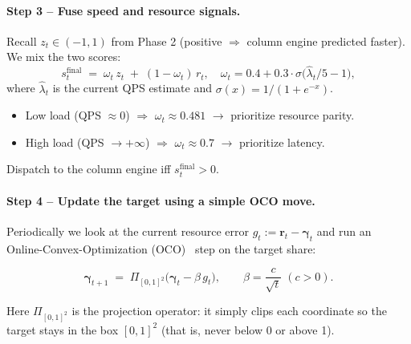 \documentclass[sigconf, nonacm]{acmart}
\begin{document}
\paragraph{Step 3 – Fuse speed and resource signals.}
Recall $z_t\in(-1,1)$ from Phase 2
(positive $\Rightarrow$ column engine predicted faster).
We mix the two scores:
\[
  s^{\text{final}}_t
  \;=\;
  \omega_t\,z_t \;+\; (1-\omega_t)\,r_t,
\quad
  \omega_t = 
    0.4 + 0.3 \cdot
    \sigma\!\bigl(\hat\lambda_t/5-1\bigr),
\]
where \(\hat{\lambda}_t\) is the current QPS estimate and \(\sigma(x) = 1/(1 + e^{-x})\).  
\begin{itemize}[leftmargin=*]
  \item Low load (QPS \(\approx 0\)) \(\Rightarrow\) \(\omega_t \approx 0.481\)  
    \(\rightarrow\) prioritize resource parity.
  \item High load (QPS \(\to +\infty\)) \(\Rightarrow\) \(\omega_t \approx 0.7\)  
    \(\rightarrow\) prioritize latency.
\end{itemize}

Dispatch to the column engine iff $s^{\text{final}}_t>0$.

\paragraph{Step 4 – Update the target using a simple OCO move.}
Periodically we look at the current resource error  
$g_t := \mathbf r_t - \boldsymbol\gamma_t$  
and run an Online-Convex-Optimization (OCO)~\cite{zinkevich2003online} step on the target share:

\begin{equation}
  \boldsymbol\gamma_{t+1}
  \;=\;
  \Pi_{[0,1]^2}\!
  \bigl(
     \boldsymbol\gamma_t - \beta\, g_t
  \bigr),
  \qquad
  \beta = \frac{c}{\sqrt{t}}\;(c>0).
\end{equation}

\noindent
Here $\Pi_{[0,1]^2}$ is the projection operator:
it simply clips each coordinate so the target stays in the box
$[0,1]^2$ (that is, never below 0 or above 1).
\end{document}
